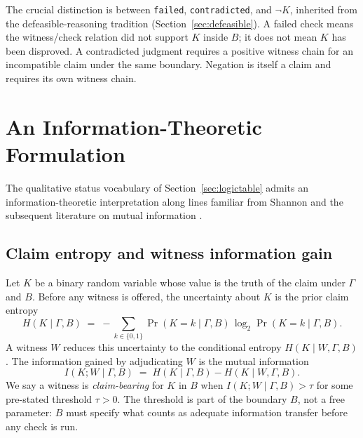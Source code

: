 \documentclass[11pt, a4paper]{article}
\theoremstyle{upldef}
\newcommand{\statuslabel}[1]{\texttt{\small #1}}
\begin{document}
The crucial distinction is between \statuslabel{failed},
\statuslabel{contradicted}, and $\neg K$, inherited from the
defeasible-reasoning tradition (Section~\ref{sec:defeasible}). A
failed check means the witness/check relation did not support $K$
inside $B$; it does not mean $K$ has been disproved. A contradicted
judgment requires a positive witness chain for an incompatible claim
under the same boundary. Negation is itself a claim and requires its
own witness chain.

\section{An Information-Theoretic Formulation}
\label{sec:entropy}

The qualitative status vocabulary of Section~\ref{sec:logictable}
admits an information-theoretic interpretation along lines familiar
from Shannon \citep{shannon1948} and the subsequent literature on
mutual information \citep{cover2006}.

\subsection{Claim entropy and witness information gain}

Let $K$ be a binary random variable whose value is the truth of the
claim under $\Gamma$ and $B$. Before any witness is offered, the
uncertainty about $K$ is the prior claim entropy
\[
H(K \mid \Gamma, B) \;=\; -\!\!\sum_{k \in \{0,1\}}
\Pr(K=k \mid \Gamma, B)\,\log_2 \Pr(K=k \mid \Gamma, B).
\]
A witness $W$ reduces this uncertainty to the conditional entropy
$H(K \mid W, \Gamma, B)$. The information gained by adjudicating
$W$ is the mutual information
\begin{equation}
I(K; W \mid \Gamma, B)
\;=\;
H(K \mid \Gamma, B) - H(K \mid W, \Gamma, B).
\label{eq:gain}
\end{equation}
We say a witness is \emph{claim-bearing} for $K$ in $B$ when
$I(K; W \mid \Gamma, B) > \tau$ for some pre-stated threshold
$\tau > 0$. The threshold is part of the boundary $B$, not a free
parameter: $B$ must specify what counts as adequate information
transfer before any check is run.
\end{document}
